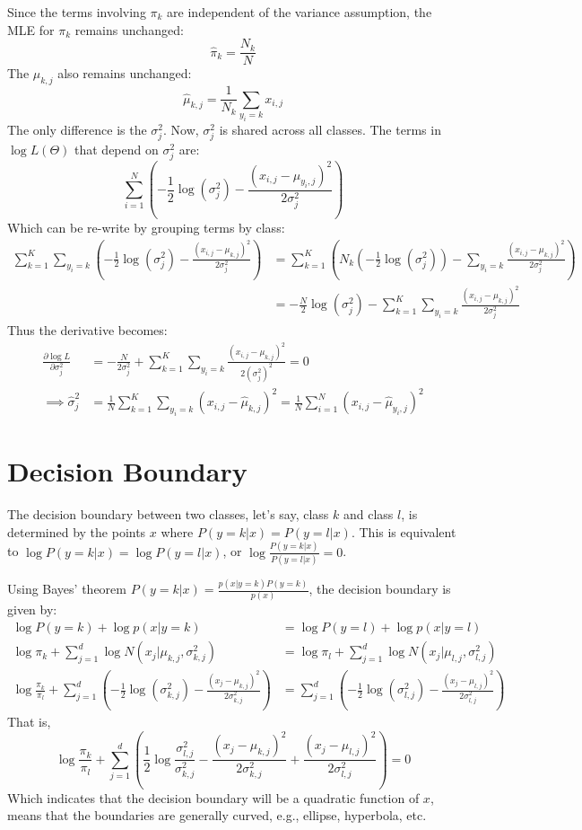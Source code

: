 \documentclass[11pt, a4paper, oneside]{memoir}
\begin{document}
Since the terms involving $\pi_k$ are independent of the variance assumption, the MLE for $\pi_k$ remains unchanged:
\[ \hat{\pi}_k = \frac{N_k}{N} \]
The $\mu_{k,j}$ also remains unchanged:
\[ \hat{\mu}_{k,j} = \frac{1}{N_k} \sum_{y_i=k} x_{i,j} \]
The only difference is the $\sigma^2_j$.
Now, $\sigma^2_j$ is shared across all classes. The terms in $\log L(\Theta)$ that depend on $\sigma^2_j$ are:
\[ \sum_{i=1}^{N} \left( -\frac{1}{2} \log(\sigma^2_{j}) - \frac{(x_{i,j} - \mu_{y_i,j})^2}{2\sigma^2_{j}} \right) \]
Which can be re-write by grouping terms by class:
\begin{align*}
\sum_{k=1}^{K} \sum_{y_i=k} \left( -\frac{1}{2} \log(\sigma^2_{j}) - \frac{(x_{i,j} - \mu_{k,j})^2}{2\sigma^2_{j}} \right) &=
\sum_{k=1}^{K} \left( N_k \left(-\frac{1}{2} \log(\sigma^2_{j})\right) - \sum_{y_i=k} \frac{(x_{i,j} - \mu_{k,j})^2}{2\sigma^2_{j}} \right) \\
&= -\frac{N}{2} \log(\sigma^2_{j}) - \sum_{k=1}^{K} \sum_{y_i=k} \frac{(x_{i,j} - \mu_{k,j})^2}{2\sigma^2_{j}}
\end{align*}
Thus the derivative becomes:
\begin{align*}
  \frac{\partial \log L}{\partial \sigma^2_j} &= -\frac{N}{2\sigma^2_j} + \sum_{k=1}^{K} \sum_{y_i=k} \frac{(x_{i,j} - \mu_{k,j})^2}{2(\sigma^2_j)^2} = 0 \\
  \implies \hat{\sigma}^2_j &= \frac{1}{N} \sum_{k=1}^{K} \sum_{y_i=k} (x_{i,j} - \hat{\mu}_{k,j})^2 = \frac{1}{N} \sum_{i=1}^{N} (x_{i,j} - \hat{\mu}_{y_i,j})^2
\end{align*}

\section{Decision Boundary}
The decision boundary between two classes, let's say, class $k$ and class $l$, is determined by the points $x$ where $P(y=k|x) = P(y=l|x)$.
This is equivalent to $\log P(y=k|x) = \log P(y=l|x)$, or $\log \frac{P(y=k|x)}{P(y=l|x)} = 0$.

Using Bayes' theorem $P(y=k|x) = \frac{p(x|y=k)P(y=k)}{p(x)}$, the decision boundary is given by:
\begin{align*}  
  \log P(y=k) + \log p(x|y=k) &= \log P(y=l) + \log p(x|y=l) \\
  \log \pi_k + \sum_{j=1}^{d} \log N(x_j | \mu_{k,j}, \sigma^2_{k,j}) &= \log \pi_l + \sum_{j=1}^{d} \log N(x_j | \mu_{l,j}, \sigma^2_{l,j}) \\
  \log \frac{\pi_k}{\pi_l} + \sum_{j=1}^{d} \left( -\frac{1}{2} \log(\sigma^2_{k,j}) - \frac{(x_j - \mu_{k,j})^2}{2\sigma^2_{k,j}} \right)
  &= \sum_{j=1}^{d} \left( -\frac{1}{2} \log(\sigma^2_{l,j}) - \frac{(x_j - \mu_{l,j})^2}{2\sigma^2_{l,j}} \right)
\end{align*}
That is,
\[ \log \frac{\pi_k}{\pi_l} + \sum_{j=1}^{d} \left( \frac{1}{2} \log \frac{\sigma^2_{l,j}}{\sigma^2_{k,j}} - \frac{(x_j - \mu_{k,j})^2}{2\sigma^2_{k,j}} + \frac{(x_j - \mu_{l,j})^2}{2\sigma^2_{l,j}} \right) = 0 \]
Which indicates that the decision boundary will be a quadratic function of $x$,
means that the boundaries are generally curved, e.g., ellipse, hyperbola, etc.
\end{document}

